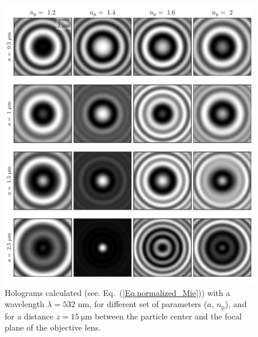 \begin{figure}
	\centering
	\includegraphics{02_body/chapter2/images/holo_size_exemple/holos_fix_z.pdf}
	\caption{Holograms calculated (see. Eq.~(\ref{Eq.normalized_Mie})) with a wavelength $\lambda = 532$ nm, for different set of parameters ($a$, $n_\mathrm{p}$), and for a distance $z = 15 ~\mathrm{\mu m}$ between the particle center and the focal plane of the objective lens.~\href{https://github.com/eXpensia/Confined-Brownian-Motion/blob/main/02_body/chapter2/images/holo_size_exemple/holosize_variation.ipynb}{\faGithub}}
	\label{fig:holo_fix_z}
\end{figure}



